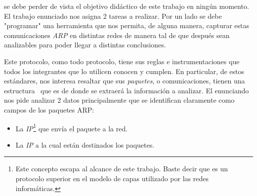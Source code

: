  se debe perder de vista el objetivo did\'actico de
	este trabajo en ning\'un momento. El trabajo enunciado nos asigna
    2 tareas a realizar. Por un lado se debe "programar" una herramienta
    que nos permita, de alguna manera, capturar estas comunicaciones
   	\textit{ARP} en distintas redes de manera tal de que despu\'es sean
    analizables para poder llegar a distintas conclusiones.
    
\par Este protocolo, como todo protocolo, tiene sus reglas e instrumentaciones
	que todos los integrantes que lo utilicen conocen y cumplen. En particular,
    de estos est\'andares, nos interesa resaltar que sus \textit{paquetes},
    o comunicaciones, tienen una estructura~\cite{rfc826} que es de donde 
    se extraer\'a la informaci\'on a analizar. El enunciando nos pide analizar 2
    datos principalmente que se identifican claramente como campos de los
    paquetes ARP:

\begin{itemize}
	\item La \textit{IP}\footnote{Este concepto escapa al alcance de este trabajo.
    Baste decir que es un protocolo superior en el modelo de capas utilizado por las
    redes inform\'aticas.} que env\'ia el paquete a la red.
    
    \item La \textit{IP} a la cual est\'an destinados los paquetes.
\end{itemize}

\bigskip


